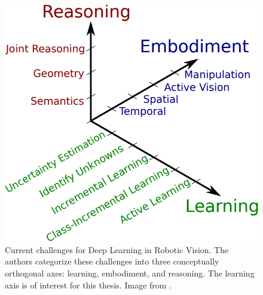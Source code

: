 \begin{figure}[h!]
 	\centering
 	\includegraphics[width=0.75\linewidth]{images/rvchallenges.png}
 	\caption{Current challenges for Deep Learning in Robotic Vision. The authors categorize these challenges into three conceptually orthogonal axes:
 		learning, embodiment, and reasoning. The learning axis is of interest for this thesis. Image from \cite{surveydeeplimits}.}
 \end{figure}
 
